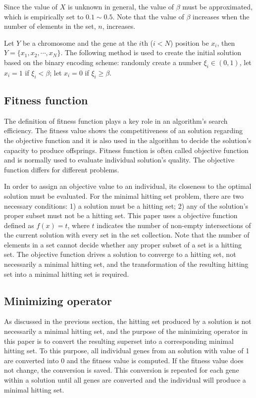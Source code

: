 Since the value of $X$ is unknown in general, the value of $\beta$ must be approximated, which is empirically set to $0.1 \sim 0.5$.
Note that the value of $\beta$ increases when the number of elements in the set, $n$, increases.

Let $Y$ be a chromosome and the gene at the $i$th ($i < N$) position be $x_i$, then $Y = \{x_1, x_2, \cdots, x_N\}$.
The following method is used to create the initial solution based on the binary encoding scheme:
randomly create a number $\xi_i \in (0, 1)$, let $x_i = 1$ if $\xi_i < \beta$; let $x_i = 0$ if $\xi_i \geq \beta$.

\subsection{Fitness function}
The definition of fitness function plays a key role in an algorithm's search efficiency.
The fitness value shows the competitiveness of an solution regarding the objective function and it is also used in the algorithm to decide the solution's capacity to produce offsprings.
Fitness function is often called objective function and is normally used to evaluate individual solution's quality.
The objective function differs for different problems.

In order to assign an objective value to an individual, its closeness to the optimal solution must be evaluated.
For the minimal hitting set problem, there are two necessary conditions: 1) a solution must be a hitting set; 2) any of the solution's proper subset must not be a hitting set.
This paper uses a objective function defined as $f(x) = t$, where $t$ indicates the number of non-empty intersections of the current solution with every set in the set collection.
Note that the number of elements in a set cannot decide whether any proper subset of a set is a hitting set.
The objective function drives a solution to converge to a hitting set, not necessarily a minimal hitting set, and the transformation of the resulting hitting set into a minimal hitting set is required.



\subsection{Minimizing operator}
As discussed in the previous section, the hitting set produced by a solution is not necessarily a minimal hitting set, and the purpose of the minimizing operator in this paper is to convert the resulting superset into a corresponding minimal hitting set.
To this purpose, all individual genes from an solution with value of 1 are converted into 0 and the fitness value is computed.
If the fitness value does not change, the conversion is saved.
This conversion is repeated for each gene within a solution until all genes are converted and the individual will produce a minimal hitting set.

